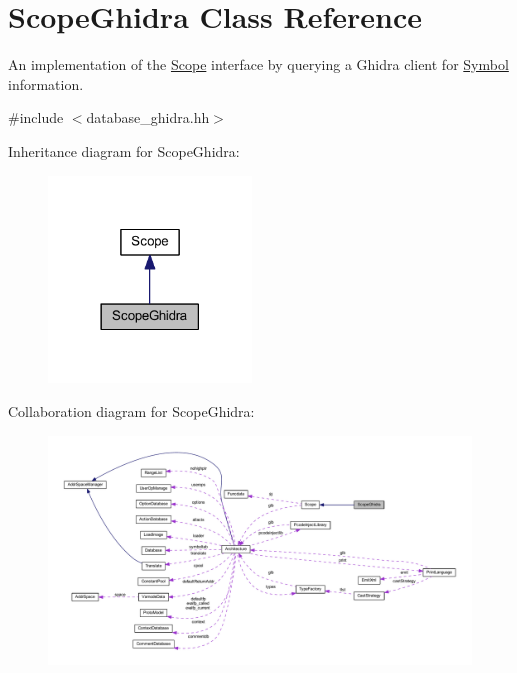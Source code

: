 \hypertarget{class_scope_ghidra}{}\section{Scope\+Ghidra Class Reference}
\label{class_scope_ghidra}


An implementation of the \mbox{\hyperlink{class_scope}{Scope}} interface by querying a Ghidra client for \mbox{\hyperlink{class_symbol}{Symbol}} information.  




{\ttfamily \#include $<$database\+\_\+ghidra.\+hh$>$}



Inheritance diagram for Scope\+Ghidra\+:
\nopagebreak
\begin{figure}[H]
\begin{center}
\leavevmode
\includegraphics[width=153pt]{class_scope_ghidra__inherit__graph}
\end{center}
\end{figure}


Collaboration diagram for Scope\+Ghidra\+:
\nopagebreak
\begin{figure}[H]
\begin{center}
\leavevmode
\includegraphics[width=350pt]{class_scope_ghidra__coll__graph}
\end{center}
\end{figure}

